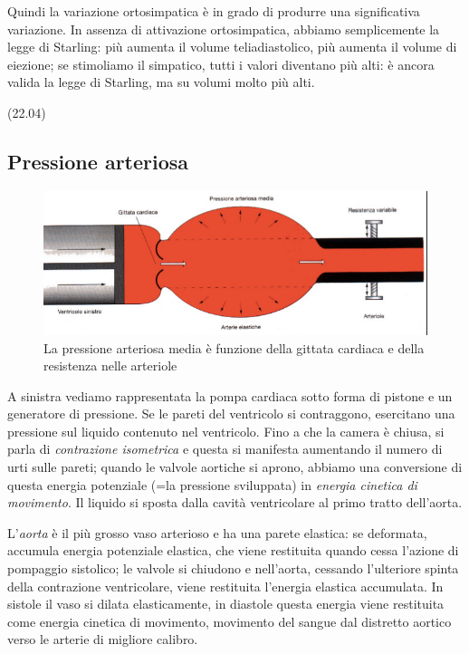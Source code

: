 \documentclass[a4paper,12pt]{article}
\begin{document}
Quindi la variazione ortosimpatica è in grado di produrre una significativa variazione. In assenza di attivazione ortosimpatica, abbiamo semplicemente la legge di Starling: più aumenta il volume teliadiastolico, più aumenta il volume di eiezione; se stimoliamo il simpatico, tutti i valori diventano più alti: è ancora valida la legge di Starling, ma su volumi molto più alti. 

 
(22.04) 

\subsection{Pressione arteriosa}
\begin{figure}[H]
\centering
\includegraphics[scale=0.35]{immagine/pompa_cardiaca.jpg}
\caption{La pressione arteriosa media è funzione della gittata cardiaca e della resistenza nelle arteriole}
\end{figure}


A sinistra vediamo rappresentata la pompa cardiaca sotto forma di pistone e un generatore di pressione. Se le pareti del ventricolo si contraggono, esercitano una pressione sul liquido contenuto nel ventricolo. Fino a che la camera è chiusa, si parla di \emph{contrazione isometrica} e questa si manifesta aumentando il numero di urti sulle pareti; quando le valvole aortiche si aprono, abbiamo una conversione di questa energia potenziale (=la pressione sviluppata) in \emph{energia cinetica di movimento}. Il liquido si sposta dalla cavità ventricolare al primo tratto dell'aorta.

L'\emph{aorta} è il più grosso vaso arterioso e ha una parete elastica: se deformata, accumula energia potenziale elastica, che viene restituita quando cessa l'azione di pompaggio sistolico; le valvole si chiudono e nell'aorta, cessando l'ulteriore spinta della contrazione ventricolare, viene restituita l'energia elastica accumulata. In sistole il vaso si dilata elasticamente, in diastole questa energia viene restituita come energia cinetica di movimento, movimento del sangue dal distretto aortico verso le arterie di migliore calibro.
\end{document}

